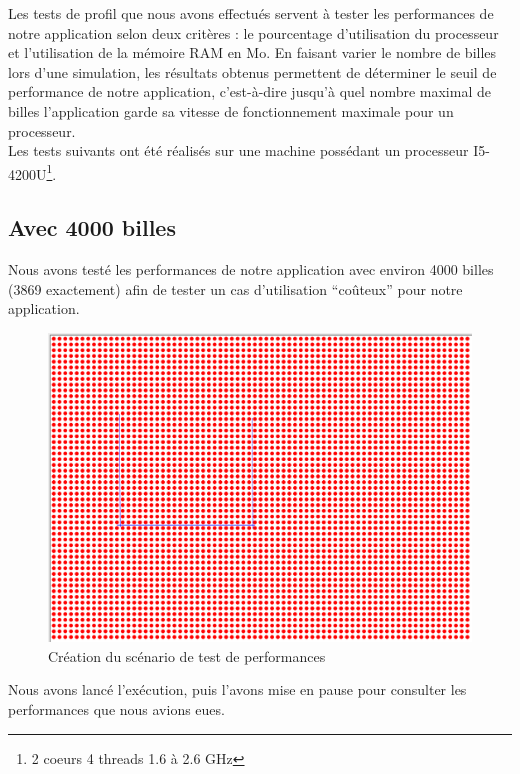 \documentclass{report}
\begin{document}
Les tests de profil que nous avons effectués servent à tester les performances de notre application selon deux critères : le pourcentage d’utilisation du processeur et l’utilisation de la mémoire RAM en Mo. En faisant varier le nombre de billes lors d’une simulation, les résultats obtenus permettent de déterminer le seuil de performance de notre application, c’est-à-dire jusqu’à quel nombre maximal de billes l’application garde sa vitesse de fonctionnement maximale pour un processeur. \\

Les tests suivants ont été réalisés sur une machine possédant un processeur I5-4200U\footnote{2 coeurs 4 threads 1.6 à 2.6 GHz}. 

\subsection{Avec 4000 billes}

Nous avons testé les performances de notre application avec environ 4000 billes (3869 exactement) afin de tester un cas d’utilisation “coûteux” pour notre application. 

\begin{figure}[H]
\centering
\includegraphics[scale=0.6]{cas_test.png}
\caption{Création du scénario de test de performances}
\end{figure}

Nous avons lancé l’exécution, puis l’avons mise en pause pour consulter les performances que nous avions eues.
\end{document}
